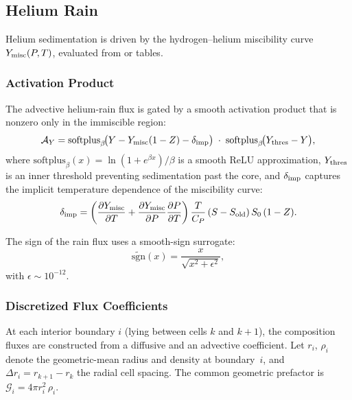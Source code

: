 \documentclass{aastex631}
\newcommand{\pp}{\partial}
\newcommand{\Cp}{C_P}
\newcommand{\Yeq}{Y_{\rm misc}}
\newcommand{\softplus}{\mathrm{softplus}}
\begin{document}
\subsection{Helium Rain}\label{sec:helium_rain}

Helium sedimentation is driven by the hydrogen--helium miscibility curve
$\Yeq(P,T)$, evaluated from \citet{Lorenzen2011} or
\citet{Schoettler2018} tables.

\subsubsection{Activation Product}

The advective helium-rain flux is gated by a smooth activation product
that is nonzero only in the immiscible region:
\begin{equation}\label{eq:Yflux_new}
  \mathcal{A}_Y
  = \softplus_\beta\!\bigl(Y - \Yeq(1-Z) - \delta_{\rm imp}\bigr)
  \;\cdot\;
  \softplus_\beta\!\bigl(Y_{\rm thres} - Y\bigr),
\end{equation}
where $\softplus_\beta(x) = \ln(1+e^{\beta x})/\beta$ is a smooth ReLU
approximation, $Y_{\rm thres}$ is an inner threshold preventing
sedimentation past the core, and $\delta_{\rm imp}$ captures the implicit
temperature dependence of the miscibility curve:
\begin{equation}
  \delta_{\rm imp}
  = \left(\frac{\pp\Yeq}{\pp T}
  + \frac{\pp\Yeq}{\pp P}\frac{\pp P}{\pp T}\right)
  \frac{T}{\Cp}\,(S - S_{\rm old})\,S_0\,(1-Z).
\end{equation}

The sign of the rain flux uses a smooth-sign surrogate:
\begin{equation}
  \widetilde{\mathrm{sgn}}(x)
  = \frac{x}{\sqrt{x^2 + \epsilon^2}},
\end{equation}
with $\epsilon\sim10^{-12}$.

\subsubsection{Discretized Flux Coefficients}\label{sec:disc_comp_flux}

At each interior boundary $i$ (lying between cells $k$ and $k+1$), the
composition fluxes are constructed from a diffusive and an advective
coefficient.  Let $r_i$, $\rho_i$ denote the geometric-mean radius and
density at boundary~$i$, and $\Delta r_i = r_{k+1} - r_k$ the radial
cell spacing.  The common geometric prefactor is
$\mathcal{G}_i = 4\pi r_i^2\,\rho_i$.
\end{document}
